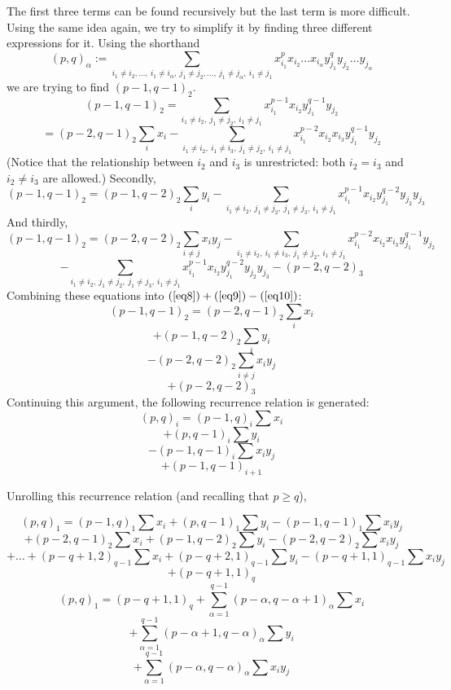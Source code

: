 The first three terms can be found recursively but the last term
is more difficult.
Using the same idea again, we try to simplify it by finding 
three different expressions for it.
Using the shorthand 
\[(p,q)_{\alpha} := 
\sum_{i_{1} \neq i_{2}, \ldots,\ i_{1} \neq i_{\alpha},\ j_{1} \neq j_{2}, \ldots,
	\ j_{1} \neq j_{\alpha},\ i_{1} \neq j_{1}}
	x_{i_{1}}^{p} x_{i_{2}} \ldots x_{i_{\alpha}}
 	y_{j_{1}}^{q} y_{j_{2}} \ldots y_{j_{\alpha}}
\]
we are trying to find $(p-1,q-1)_{2}$.
\[
(p-1,q-1)_{2} = 
\sum_{i_{1} \neq i_{2},\ j_{1} \neq j_{2},\ i_{1} \neq j_{1}}
	 x_{i_{1}}^{p-1} x_{i_{2}} y_{j_{1}}^{q-1} y_{j_{2}}
\]
\begin{equation}
\label{eq8}
 = 	(p-2,q-1)_{2} \sum_{i} x_{i}
     -  \sum_{i_{1} \neq i_{2},\ i_{1} \neq i_{3},\ j_{1} \neq j_{2},\ i_{1} \neq j_{1}} 
		x_{i_{1}}^{p-2} x_{i_{2}} x_{i_{3}} y_{j_{1}}^{q-1} y_{j_{2}}
\end{equation}
(Notice that the relationship between $i_{2}$ and $i_{3}$ is unrestricted:
both $i_{2} = i_{3}$ and $i_{2} \neq i_{3}$ are allowed.)
Secondly, 
\begin{equation}
\label{eq9}
(p-1,q-1)_{2} 
 = 	(p-1,q-2)_{2} \sum_{i} y_{i}
     -  \sum_{i_{1} \neq i_{2},\ j_{1} \neq j_{2},\ j_{1} \neq j_{3},\ i_{1} \neq j_{1}} 
		x_{i_{1}}^{p-1} x_{i_{2}} y_{j_{1}}^{q-2} y_{j_{2}} y_{j_{3}} 
\end{equation}
And thirdly, 
\begin{equation}
\label{eq10}
(p-1,q-1)_{2} 
 = 	(p-2,q-2)_{2} \sum_{i \neq j} x_{i}y_{j}
     -  \sum_{i_{1} \neq i_{2},\ i_{1} \neq i_{3},\ j_{1} \neq j_{2},\ i_{1} \neq j_{1}} 
		x_{i_{1}}^{p-2} x_{i_{2}} x_{i_{3}} y_{j_{1}}^{q-1} y_{j_{2}}
\end{equation}
\[
     -  \sum_{i_{1} \neq i_{2},\ j_{1} \neq j_{2},\ j_{1} \neq j_{3},\ i_{1} \neq j_{1}} 
		x_{i_{1}}^{p-1} x_{i_{2}} y_{j_{1}}^{q-2} y_{j_{2}} y_{j_{3}} 
     -  (p-2,q-2)_{3}
\]
Combining these equations into $(\ref{eq8}) + (\ref{eq9}) - (\ref{eq10})$:
\[
(p-1,q-1)_{2} 
 =    (p-2,q-1)_{2} \sum_{i} x_{i}
\]
\[
      + (p-1,q-2)_{2} \sum_{i} y_{i}
\]
\[
      -  (p-2,q-2)_{2} \sum_{i \neq j} x_{i}y_{j} 
\]
\[
      + (p-2,q-2)_{3}
\]
Continuing this argument, the following recurrence relation is generated:
\[	(p,q)_{i} = (p-1,q)_{i} \sum x_{i}
\]
\[
			+ (p,q-1)_{i} \sum y_{i}
\]
\[
		     	- (p-1,q-1)_{i} \sum x_{i}y_{j}
\]
\[
			+ (p-1,q-1)_{i+1}
\]

Unrolling this recurrence relation (and recalling that $p \geq q$),

\[ (p,q)_{1} = (p-1,q)_{1} \sum x_{i} + (p,q-1)_{1} \sum y_{i} -
			(p-1,q-1)_{1} \sum x_{i}y_{j}
\]
\[		+ (p-2,q-1)_{2} \sum x_{i} + (p-1,q-2)_{2} \sum y_{i} -
			(p-2,q-2)_{2} \sum x_{i}y_{j}
\]
\[	+ \ldots + (p-q+1,2)_{q-1} \sum x_{i} + (p-q+2,1)_{q-1} \sum y_{i} -
			(p-q+1,1)_{q-1} \sum x_{i}y_{j}
\]
\[	+ (p-q+1,1)_{q} 
\]
\begin{equation}
\label{eq11}
(p,q)_{1} = (p-q+1,1)_{q} + 
	\sum_{\alpha = 1}^{q-1} (p-\alpha,q-\alpha+1)_\alpha \sum x_{i}
\end{equation}
\[
	+ \sum_{\alpha = 1}^{q-1} (p-\alpha+1,q-\alpha)_\alpha \sum y_{i}
\]
\[
	+ \sum_{\alpha = 1}^{q-1} (p-\alpha,q-\alpha)_\alpha \sum x_{i}y_{j}
\]

